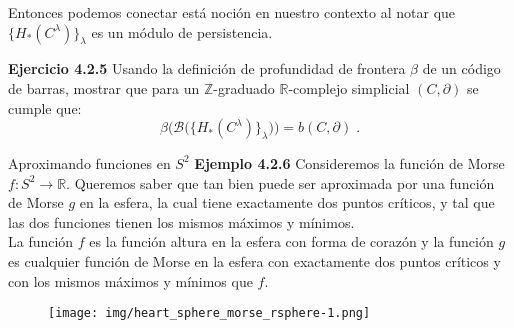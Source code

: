 \documentclass{beamer}
\newcounter{Ejercicio}
\newcommand{\calB}{{\mathcal{B}}}
\newcommand{\de}{\partial}
\def\R{\mathbb{R}}
\def\Z{\mathbb{Z}}
\begin{document}
\begin{frame}{}

Entonces podemos conectar está noción en nuestro contexto al notar que $\{ H_{*} (C^\lambda) \}_\lambda$ es un módulo de persistencia. \\[0.5cm] \pause

\textbf{{\color{violet}Ejercicio 4.2.5}} Usando la definición de profundidad de frontera $\beta$ de un código de barras, mostrar que para un $\Z$-graduado $\R$-complejo simplicial $(C, \de)$ se cumple que:
	$$\beta \Big( \calB \big( \{ H_{*} (C^\lambda) \}_\lambda \big) \Big) = b (C, \de)\;.$$
    
\end{frame}

\begin{frame}{Aproximando funciones en  $S^2$}
\textbf{{\color{cyan}Ejemplo 4.2.6}} Consideremos la función de Morse $f: S^2 \to \R$. \pause Queremos saber que tan bien puede ser aproximada por una función de Morse $g$ en la esfera, la cual tiene exactamente dos puntos críticos, y tal que las dos funciones tienen los mismos máximos y mínimos. \\[0.3cm]\pause 
La función $f$ es la función altura en la esfera con forma de corazón y la función $g$ es cualquier función de Morse en la esfera con exactamente dos puntos críticos y con los mismos máximos y mínimos que $f$. 
\begin{figure}[!ht]
	\centering
	\texttt{[image: img/heart\_sphere\_morse\_rsphere-1.png]}

	\label{fig: heart_sphere_morse_rsphere}
\end{figure}
   
\end{frame}
\end{document}
